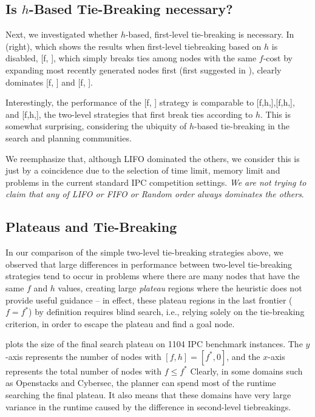 \subsection{Is $h$-Based Tie-Breaking necessary?}

Next, we investigated whether $h$-based, first-level tie-breaking is necessary.
In  (right), which shows the results when  first-level
tiebreaking based on $h$ is disabled, [f, \lifo], which simply breaks ties among nodes with the same $f$-cost by expanding most recently generated nodes first (first suggested in \cite{korf85depth}),
clearly dominates [f, \fifo] and [f, \ro].

Interestingly, the performance of the [f, \lifo] strategy
is comparable to [f,h,\lifo],[f,h,\fifo], and [f,h,\ro], the two-level strategies that first break ties according to $h$.
This is somewhat surprising, considering the ubiquity of $h$-based tie-breaking in the search and planning communities.

We reemphasize that, although LIFO dominated the others, we consider
this is just by a coincidence due to the selection of time limit, memory
limit and problems in the current standard IPC competition
settings. \emph{We are not trying to claim that any of LIFO or FIFO or
Random order always dominates the others}.


\subsection{Plateaus and Tie-Breaking}

In our comparison of the simple two-level tie-breaking strategies
above, we observed that large differences in performance between
two-level tie-breaking strategies tend to occur in problems where
there are many nodes that have the same $f$ and $h$ values, creating
large \emph{plateau} regions where the heuristic does not provide
useful guidance -- in effect, these plateau regions in the last
frontier ($f=f^*$) by definition requires blind search, i.e., 
relying solely on the tie-breaking criterion, in order to escape the
plateau and find a goal node.

 plots the size of the final search plateau on 1104 IPC benchmark instances.
The $y$-axis
represents the number of nodes with $[f,h]=[f^*,0]$, and the $x$-axis represents the total
number of nodes with $f\leq f^*$ 
Clearly, in some domains such as Openstacks and Cybersec, the planner can spend most of the runtime
searching the final plateau.
It also
means that these domains have very large variance in the runtime caused
by the difference in second-level tiebreakings. 

